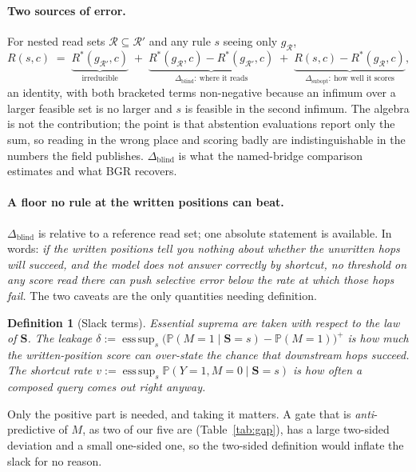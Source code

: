 \documentclass{article}
\newif\ifredflags
\newcommand{\rf}[1]{\ifredflags{\textcolor{red}{\textbf{[MISSING: #1]}}}\fi}
\newtheorem{definition}{Definition}
\newcommand{\esssup}{\operatorname*{ess\,sup}}
\newcommand{\gate}{\mathbf{S}}
\begin{document}
\paragraph{Two sources of error.} For nested read sets $\mathcal{R}\subseteq\mathcal{R}'$ and any rule
$s$ seeing only $g_{\mathcal{R}}$,
\[
R(s,c)\;=\;\underbrace{R^\ast(g_{\mathcal{R}'},c)}_{\text{irreducible}}
\;+\;\underbrace{R^\ast(g_{\mathcal{R}},c)-R^\ast(g_{\mathcal{R}'},c)}_{\Delta_{\mathrm{blind}}:\ \text{where it reads}}
\;+\;\underbrace{R(s,c)-R^\ast(g_{\mathcal{R}},c)}_{\Delta_{\mathrm{subopt}}:\ \text{how well it scores}} ,
\]
an identity, with both bracketed terms non-negative because an infimum over a larger feasible set is
no larger and $s$ is feasible in the second infimum. The algebra is not the contribution; the point is
that abstention evaluations report only the sum, so reading in the wrong place and scoring badly are
indistinguishable in the numbers the field publishes. $\Delta_{\mathrm{blind}}$ is what the
named-bridge comparison estimates and what BGR recovers.

\paragraph{A floor no rule at the written positions can beat.} $\Delta_{\mathrm{blind}}$ is relative
to a reference read set; one absolute statement is available. In words: \emph{if the written positions
tell you nothing about whether the unwritten hops will succeed, and the model does not answer
correctly by shortcut, no threshold on any score read there can push selective error below the rate at
which those hops fail.} The two caveats are the only quantities needing definition.

\begin{definition}[Slack terms]
\label{def:slack}
Essential suprema are taken with respect to the law of $\gate$. The \emph{leakage}
$\delta:=\esssup_s\big(\mathbb{P}(M=1\mid\gate=s)-\mathbb{P}(M=1)\big)^{+}$ is how much the
written-position score can \emph{over}-state the chance that downstream hops succeed. The
\emph{shortcut rate} $v:=\esssup_s\mathbb{P}(Y=1,M=0\mid\gate=s)$ is how often a composed query comes
out right anyway.
\end{definition}

Only the positive part is needed, and taking it matters. A gate that is \emph{anti}-predictive of $M$,
as two of our five are (Table~\ref{tab:gap}), has a large two-sided deviation and a small one-sided
one, so the two-sided definition would inflate the slack for no reason.
\rf{$\hat\delta=0.179$ and the $\delta_k$ values in the compounding table were computed with the
two-sided definition. Recompute them one-sided; the bound can only improve, and it is currently
vacuous on four of five models.}
\end{document}

